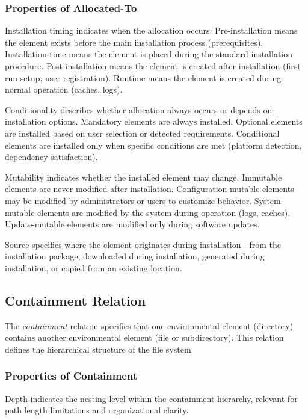 \documentclass[11pt]{article}
\begin{document}
\subsubsection{Properties of Allocated-To}

Installation timing indicates when the allocation occurs. Pre-installation means the element exists before the main installation process (prerequisites). Installation-time means the element is placed during the standard installation procedure. Post-installation means the element is created after installation (first-run setup, user registration). Runtime means the element is created during normal operation (caches, logs).

Conditionality describes whether allocation always occurs or depends on installation options. Mandatory elements are always installed. Optional elements are installed based on user selection or detected requirements. Conditional elements are installed only when specific conditions are met (platform detection, dependency satisfaction).

Mutability indicates whether the installed element may change. Immutable elements are never modified after installation. Configuration-mutable elements may be modified by administrators or users to customize behavior. System-mutable elements are modified by the system during operation (logs, caches). Update-mutable elements are modified only during software updates.

Source specifies where the element originates during installation---from the installation package, downloaded during installation, generated during installation, or copied from an existing location.

\subsection{Containment Relation}

The \textit{containment} relation specifies that one environmental element (directory) contains another environmental element (file or subdirectory). This relation defines the hierarchical structure of the file system.

\subsubsection{Properties of Containment}

Depth indicates the nesting level within the containment hierarchy, relevant for path length limitations and organizational clarity.
\end{document}
